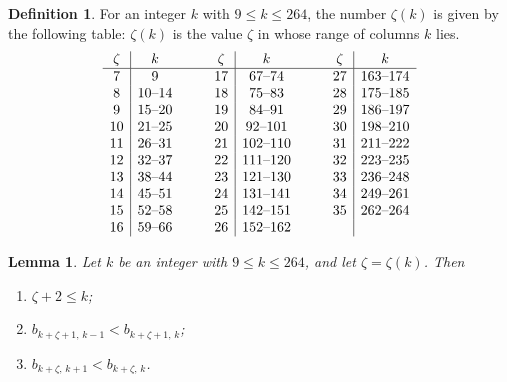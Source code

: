 \documentclass{amsart}
\newtheorem{lemma}[theorem]{Lemma}
\theoremstyle{definition}
\newtheorem{definition}[theorem]{Definition}
\theoremstyle{remark}
\numberwithin{equation}{section}
\begin{document}
\begin{definition}\label{def:zeta}
For an integer $k$ with $9\le k\le 264$, the number $\zeta(k)$ is given by the following table: $\zeta(k)$ is the value $\zeta$ in whose range of columns $k$ lies.
\[
\begin{array}{c|c@{\qquad\quad}c|c@{\qquad\quad}c|c}
\zeta & k & \zeta & k & \zeta & k\\ \hline
7 & 9 & 17 & 67\text{--}74 & 27 & 163\text{--}174\\
8 & 10\text{--}14 & 18 & 75\text{--}83 & 28 & 175\text{--}185\\
9 & 15\text{--}20 & 19 & 84\text{--}91 & 29 & 186\text{--}197\\
10 & 21\text{--}25 & 20 & 92\text{--}101 & 30 & 198\text{--}210\\
11 & 26\text{--}31 & 21 & 102\text{--}110 & 31 & 211\text{--}222\\
12 & 32\text{--}37 & 22 & 111\text{--}120 & 32 & 223\text{--}235\\
13 & 38\text{--}44 & 23 & 121\text{--}130 & 33 & 236\text{--}248\\
14 & 45\text{--}51 & 24 & 131\text{--}141 & 34 & 249\text{--}261\\
15 & 52\text{--}58 & 25 & 142\text{--}151 & 35 & 262\text{--}264\\
16 & 59\text{--}66 & 26 & 152\text{--}162 & &
\end{array}
\]
\end{definition}

\begin{lemma}\label{lem:signpairs}
Let $k$ be an integer with $9\le k\le 264$, and let $\zeta=\zeta(k)$. Then
\begin{enumerate}
\item $\zeta+2\le k$;
\item $b_{k+\zeta+1,\,k-1}<b_{k+\zeta+1,\,k}$;
\item $b_{k+\zeta,\,k+1}<b_{k+\zeta,\,k}$.
\end{enumerate}
\end{lemma}
\end{document}
